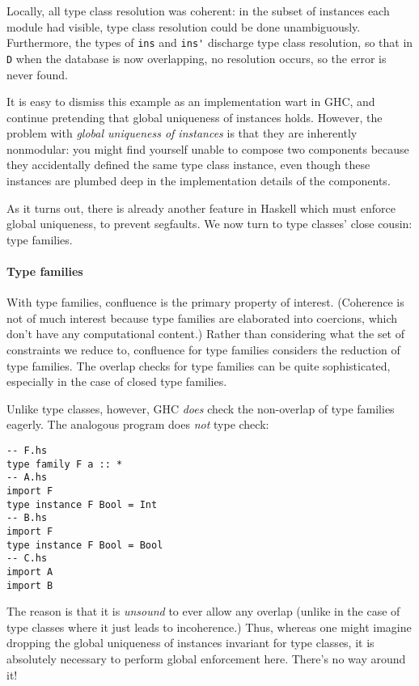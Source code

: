 \documentclass{article}
\begin{document}
Locally, all type class resolution was coherent: in the subset of
instances each module had visible, type class resolution could be done
unambiguously.  Furthermore, the types of \verb|ins| and \verb|ins'|
discharge type class resolution, so that in \verb|D| when the database
is now overlapping, no resolution occurs, so the error is never found.

It is easy to dismiss this example as an implementation wart in GHC, and
continue pretending that global uniqueness of instances holds.  However,
the problem with \emph{global uniqueness of instances} is that they are
inherently nonmodular: you might find yourself unable to compose two
components because they accidentally defined the same type class
instance, even though these instances are plumbed deep in the
implementation details of the components.

As it turns out, there is already another feature in Haskell which
must enforce global uniqueness, to prevent segfaults.
We now turn to type classes' close cousin: type families.

\paragraph{Type families}  With type families, confluence is the primary
property of interest.  (Coherence is not of much interest because type
families are elaborated into coercions, which don't have any
computational content.)  Rather than considering what the set of
constraints we reduce to, confluence for type families considers the
reduction of type families.  The overlap checks for type families
can be quite sophisticated, especially in the case of closed type
families.

Unlike type classes, however, GHC \emph{does} check the non-overlap
of type families eagerly.  The analogous program does \emph{not} type check:

\begin{verbatim}
-- F.hs
type family F a :: *
-- A.hs
import F
type instance F Bool = Int
-- B.hs
import F
type instance F Bool = Bool
-- C.hs
import A
import B
\end{verbatim}

The reason is that it is \emph{unsound} to ever allow any overlap
(unlike in the case of type classes where it just leads to incoherence.)
Thus, whereas one might imagine dropping the global uniqueness of instances
invariant for type classes, it is absolutely necessary to perform global
enforcement here.  There's no way around it!
\end{document}
